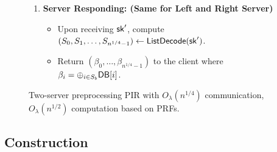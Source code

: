\begin{figure}[p]
\begin{minipage}{\textwidth}
\begin{mdframed}
\begin{enumerate}[leftmargin=5mm,itemsep=1pt]
\begin{itemize}[leftmargin=5mm,itemsep=1pt]
                   \item Sample $\sk_2$ such that $x\in\Set(\sk_2)$.
                   \item 
                   Find the first unconsumed 
                   replacement entries  
                   $(r_2, \DB[r_2])$ retrieved from left server, 
                   such that $r_2$ is in $\chunk(x)$.
                   \item $(\sk_2',j_2)\gets\Program(\sk_2,\chunk(x),r_2\text{ mod } \sqrt{n})$. 
                   \item Send $\sk_2'$ to right server.
                   \item Receive $(\beta_{0,2},\ldots,\beta_{n^{1/4}-1,2})$
                   from the right server.        
                   \item Replace the hint $(\sk,p)$ with $(\sk_2,\DB[r_2]\xor \beta_{j_2,2}\xor y)$ in the table.
               \end{itemize}
               
               \item 
               {\bf Server Responding: (Same for Left and Right Server)}
               \begin{itemize}[leftmargin=5mm,itemsep=1pt]
                   \item  Upon receiving $\mathsf{sk}'$, compute $(S_0,S_1,\ldots,S_{n^{1/4}-1})\gets \mathsf{ListDecode}(\mathsf{sk}')$.
                   \item Return $(\beta_0,\dots,\beta_{n^{1/4}-1})$ to the client where $\beta_i=\oplus_{i\in S_b}\mathsf{DB}[i]$.
               \end{itemize} %
               
            \end{enumerate}
        \end{mdframed}
    \end{minipage}
    \caption{Two-server preprocessing PIR with ${O}_\lambda(n^{1/4})$ communication, ${O}_\lambda(n^{1/2})$ computation based on PRFs. 
    }
    \label{fig:2server-new}
\end{figure}





\subsection{Construction}

